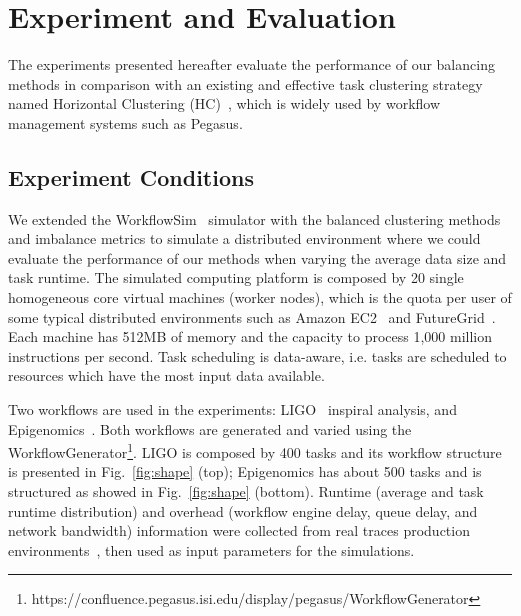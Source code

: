 \section{Experiment and Evaluation}
\label{sec:experiments}

The experiments presented hereafter evaluate the performance of our balancing methods in comparison with an existing and effective task clustering strategy named Horizontal Clustering (HC)~\cite{Singh:2008:WTC:1341811.1341822}, which is widely used by workflow management systems such as Pegasus. 

\subsection{Experiment Conditions}

We extended the WorkflowSim~\cite{WorkflowSim} simulator with the balanced clustering methods and imbalance metrics to simulate a distributed environment where we could evaluate the performance of our methods when varying the average data size and task runtime. The simulated computing platform is composed by 20 single homogeneous core virtual machines (worker nodes), which is the quota per user of some typical distributed environments such as Amazon EC2~\cite{AmazonAWS} and FutureGrid~\cite{FutureGrid}. Each machine has 512MB of memory and the capacity to process 1,000 million instructions per second. Task scheduling is data-aware, i.e. tasks are scheduled to resources which have the most input data available.

Two workflows are used in the experiments: LIGO~\cite{LIGO} inspiral analysis, and Epigenomics~\cite{Epigenome}. 
Both workflows are generated and varied using the WorkflowGenerator\footnote[1]{https://confluence.pegasus.isi.edu/display/pegasus/WorkflowGenerator}. LIGO is composed by 400 tasks and its workflow structure is presented in Fig.~\ref{fig:shape} (top); Epigenomics has about 500 tasks and is structured as showed in Fig.~\ref{fig:shape} (bottom). Runtime (average and task runtime distribution) and overhead (workflow engine delay, queue delay, and network bandwidth) information were collected from real traces production environments~\cite{Chen2011, Juve2013}, then used as input parameters for the simulations.


